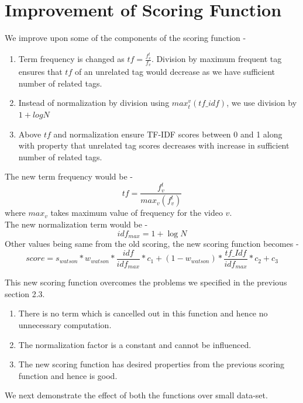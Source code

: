 \documentclass[12pt]{report}
\begin{document}
\section{Improvement of Scoring Function}
We improve upon some of the components of the scoring function -
\begin{enumerate}
\item Term frequency is changed as $tf=\frac{f_v^t}{f_v}$. Division by maximum frequent tag ensures that $tf$ of an unrelated tag would decrease as we have sufficient number of related tags.
\item Instead of normalization by division using $max_t^v(tf\_idf)$, we use division by $1 + log{N}$
\item Above $tf$ and normalization ensure TF-IDF scores between 0 and 1 along with property that unrelated tag scores decreases with increase in sufficient number of related tags.
\end{enumerate}
\vspace{1em}

The new term frequency would be -
\begin{equation}
tf = \frac{f^t_v}{max_v(f_v^t)}
\end{equation}
where $max_v$ takes maximum value of frequency for the video $v$.\\
The new normalization term would be -
\begin{equation}
idf_{max} = 1 + \log N
\end{equation}
Other values being same from the old scoring, the new scoring function becomes -
\begin{equation}
score = s_{watson}*w_{watson}*\frac{idf}{idf_{max}}*c_1 + (1-w_{watson}) * \frac{tf\_Idf}{idf_{max}} * c_2 + c_3
\end{equation}

This new scoring function overcomes the problems we specified in the previous section 2.3. 
\begin{enumerate}
\item There is no term which is cancelled out in this function and hence no unnecessary computation.
\item The normalization factor is a constant and cannot be influenced.
\item The new scoring function has desired properties from the previous scoring function and hence is good.
\end{enumerate}
\vspace{1em}
We next demonstrate the effect of both the functions over small data-set.
\end{document}
